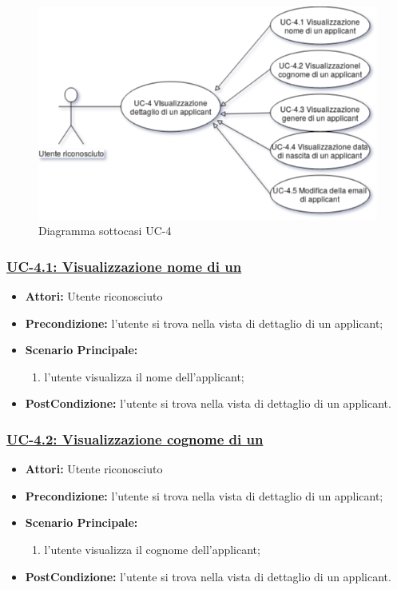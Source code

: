 \begin{figure}[!h] 
	\centering 
	\includegraphics[width=1\columnwidth]{immagini/usecase/UC4} 
	\caption{Diagramma sottocasi UC-4}
	\label{figura:uc-4}
\end{figure}

\subsubsection{\underline{UC-4.1: Visualizzazione nome di un \applicant}}
\begin{itemize}
\item \textbf{Attori:} Utente riconosciuto
\item \textbf{Precondizione:} l'utente si trova nella vista di dettaglio di un applicant;
\item \textbf{Scenario Principale:}
\begin{enumerate} 
	\item l'utente visualizza il nome dell'applicant;
\end{enumerate}
\item \textbf{PostCondizione:} l'utente si trova nella vista di dettaglio di un applicant.
\end{itemize}

\subsubsection{\underline{UC-4.2: Visualizzazione cognome di un \applicant}}
\begin{itemize}
	\item \textbf{Attori:} Utente riconosciuto
	\item \textbf{Precondizione:} l'utente si trova nella vista di dettaglio di un applicant;
	\item \textbf{Scenario Principale:}
	\begin{enumerate} 
		\item l'utente visualizza il cognome dell'applicant;
	\end{enumerate}
	\item \textbf{PostCondizione:} l'utente si trova nella vista di dettaglio di un applicant.
\end{itemize}

